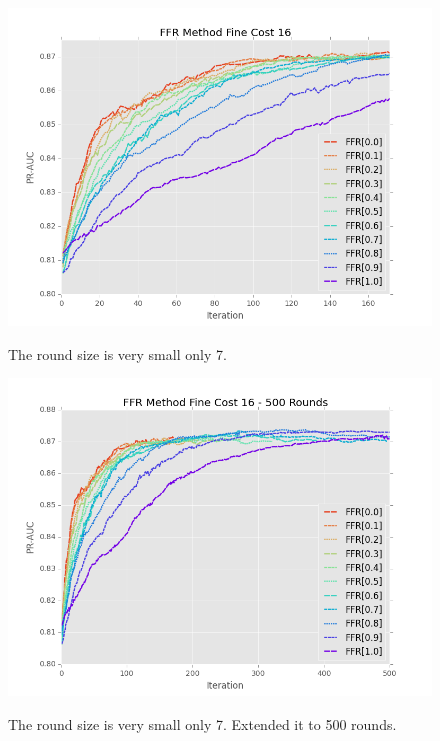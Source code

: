 \documentclass[ms]{nuthesis}
\begin{document}
\FloatBarrier
\begin{figure}[!htb]
	\centering
    \includegraphics[width=1.0\columnwidth]{fig/FFR_PR_Cost16_rnds0_171}
    \label{fig:FFR_PR_Cost16_rnds0_171}
    \caption{The round size is very small only 7.}
\end{figure}
\FloatBarrier


\FloatBarrier
\begin{figure}[!htb]
	\centering
    \includegraphics[width=1.0\columnwidth]{fig/FFR_PR_Cost16_rnds0_500}
    \label{fig:FFR_PR_Cost16_rnds0_500}
    \caption{The round size is very small only 7. Extended it to 500 rounds.}
\end{figure}
\FloatBarrier
\end{document}

